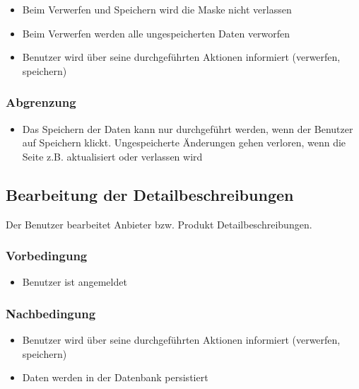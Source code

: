 \documentclass[a4paper,12pt]{article}
\begin{document}
\begin{itemize}

\item
  Beim Verwerfen und Speichern wird die Maske nicht verlassen
\item
  Beim Verwerfen werden alle ungespeicherten Daten verworfen
\item
  Benutzer wird über seine durchgeführten Aktionen informiert
  (verwerfen, speichern)
\end{itemize}

\subsubsection{Abgrenzung}\label{abgrenzung-2}

\begin{itemize}

\item
  Das Speichern der Daten kann nur durchgeführt werden, wenn der
  Benutzer auf Speichern klickt. Ungespeicherte Änderungen gehen
  verloren, wenn die Seite z.B. aktualisiert oder verlassen wird
\end{itemize}

\clearpage

\subsection{Bearbeitung der Detailbeschreibungen}
Der Benutzer bearbeitet Anbieter bzw. Produkt Detailbeschreibungen.

\subsubsection{Vorbedingung}\label{vorbedingung-3}

\begin{itemize}

\item
  Benutzer ist angemeldet
\end{itemize}

\subsubsection{Nachbedingung}\label{nachbedingung-3}

\begin{itemize}

\item
  Benutzer wird über seine durchgeführten Aktionen informiert
  (verwerfen, speichern)
\item
  Daten werden in der Datenbank persistiert
\end{itemize}
\end{document}
